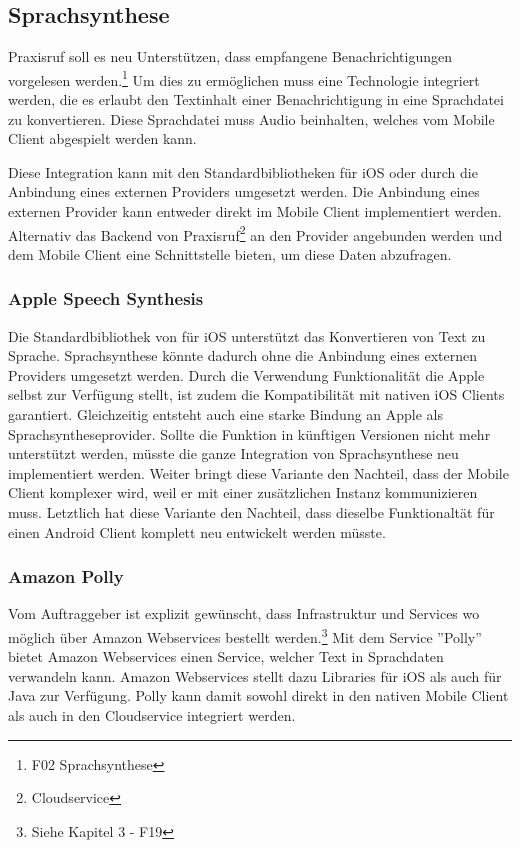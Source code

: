 \subsection{Sprachsynthese}

Praxisruf soll es neu Unterstützen, dass empfangene Benachrichtigungen vorgelesen werden.\footnote{F02 Sprachsynthese}
Um dies zu ermöglichen muss eine Technologie integriert werden, die es erlaubt den Textinhalt einer Benachrichtigung in eine Sprachdatei zu konvertieren.
Diese Sprachdatei muss Audio beinhalten, welches vom Mobile Client abgespielt werden kann.

Diese Integration kann mit den Standardbibliotheken für iOS oder durch die Anbindung eines externen Providers umgesetzt werden.
Die Anbindung eines externen Provider kann entweder direkt im Mobile Client implementiert werden.
Alternativ das Backend von Praxisruf\footnote{Cloudservice} an den Provider angebunden werden und dem Mobile Client eine Schnittstelle bieten, um diese Daten abzufragen.

\subsubsection*{Apple Speech Synthesis}

Die Standardbibliothek von für iOS unterstützt das Konvertieren von Text zu Sprache.\cite{ios_speech_synthesis}
Sprachsynthese könnte dadurch ohne die Anbindung eines externen Providers umgesetzt werden.
Durch die Verwendung Funktionalität die Apple selbst zur Verfügung stellt, ist zudem die Kompatibilität mit nativen iOS Clients garantiert.
Gleichzeitig entsteht auch eine starke Bindung an Apple als Sprachsyntheseprovider.
Sollte die Funktion in künftigen Versionen nicht mehr unterstützt werden, müsste die ganze Integration von Sprachsynthese neu implementiert werden.
Weiter bringt diese Variante den Nachteil, dass der Mobile Client komplexer wird, weil er mit einer zusätzlichen Instanz kommunizieren muss.
Letztlich hat diese Variante den Nachteil, dass dieselbe Funktionaltät für einen Android Client komplett neu entwickelt werden müsste.

\subsubsection*{Amazon Polly}

Vom Auftraggeber ist explizit gewünscht, dass Infrastruktur und Services wo möglich über Amazon Webservices bestellt werden.\footnote{Siehe Kapitel 3 - F19}
Mit dem Service ''Polly'' bietet Amazon Webservices einen Service, welcher Text in Sprachdaten verwandeln kann.\cite{aws_polly}
Amazon Webservices stellt dazu Libraries für iOS\cite{aws_polly_ios} als auch für Java zur Verfügung\cite{aws_polly_java}.
Polly kann damit sowohl direkt in den nativen Mobile Client als auch in den Cloudservice integriert werden.

